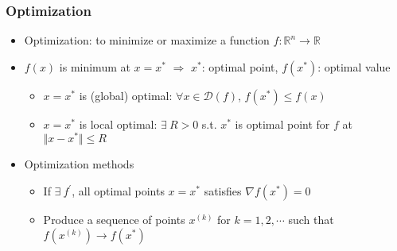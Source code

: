 \subsubsection*{Optimization}
\begin{itemize}
    \item Optimization: to minimize or maximize a function $f:\mathbb{R}^n\to\mathbb{R}$
    \item $f(x)$ is minimum at $x=x^\ast$ $\Rightarrow$ $x^\ast$: optimal point, $f(x^\ast)$: optimal value
    \begin{itemize}
        \item $x=x^\ast$ is (global) optimal: $\forall x\in\mathcal{D}(f)$, $f(x^\ast)\leq f(x)$
        \item $x=x^\ast$ is local optimal: $\exists~R>0$ s.t. $x^\ast$ is optimal point for $f$ at $\Vert x-x^\ast\Vert\leq R$
    \end{itemize}
    \item Optimization methods
    \begin{itemize}
        \item If $\exists~f^\prime$, all optimal points $x=x^\ast$ satisfies $\nabla f(x^\ast)=0$
        \item Produce a sequence of points $x^{(k)}$ for $k=1,2,\cdots$ such that $f\left(x^{(k)}\right)\to f\left(x^\ast\right)$
    \end{itemize}
\end{itemize}

